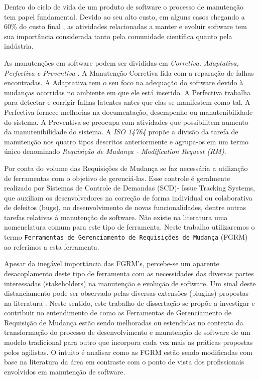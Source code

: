 Dentro do ciclo de vida de um produto de software o processo de manutenção tem
papel fundamental. Devido ao seu alto custo, em alguns casos chegando a 60\%
do custo final \cite{kaur2015review}, as atividades relacionadas a manter e
evoluir software tem sua importância considerada tanto pela comunidade
científica quanto pela indústria.

As manutenções em software podem ser divididas em \textit{Corretiva, Adaptativa,
Perfectiva e Preventiva} \cite{Lientz:1980:SMM:601062,159342}. A Manutenção
Corretiva lida com a reparação de falhas encontradas. A Adaptativa tem o seu
foco na adequação do software devido à mudanças ocorridas no ambiente em que ele
está inserido. A Perfectiva trabalha para detectar e corrigir falhas latentes
antes que elas se manifestem como tal. A  Perfectiva fornece melhorias na
documentação, desempenho ou manutenibilidade do sistema. A Preventiva se
preocupa com atividades que possibilitem aumento da manutenibilidade do sistema.
A \textit{ISO 14764} \cite{1703974} propõe a divisão da tarefa de manutenção nos
quatro tipos descritos anteriormente e agrupa-os em um termo único denominado
\textit{Requisição de Mudança - Modification Request (RM)}.

Por conta do volume das Requisições de Mudança se faz necessária a utilização de
ferramentas com o objetivo de gerenciá-las. Esse controle é geralmente realizado
por Sistemas de Controle de Demandas (SCD)- Issue Tracking Systems, que auxiliam
os desenvolvedores na correção de forma individual ou colaborativa de defeitos
(bugs), no desenvolvimento de novas funcionalidades, dentre outras tarefas
relativas à manutenção de software. Não existe na literatura uma nomenclatura
comum para este tipo de ferramenta. Neste trabalho utilizaremos o termo
\texttt{Ferramentas de Gerenciamento de Requisições de Mudança} (FGRM) ao
referimos a esta ferramenta.

Apesar da inegável importância das FGRM's, percebe-se um aparente desacoplamento 
deste tipo de ferramenta com as necessidades das diversas partes interessadas
(stakeholders) na manutenção e evolução de software. Um sinal deste
distanciamento pode ser observado pelas diversas extensões (plugins) propostas
na literatura
\cite{101186,Thung:2014:BIT:2635868.2661678,Kononenko:2014:DED:2591062.2591075}.
Neste sentido, este trabalho de dissertação se propõe a investigar e contribuir
no entendimento de como as Ferramentas de Gerenciamento de Requisição de Mudança
estão sendo melhoradas ou estendidas no contexto da transformação do processo de
desenvolvimento e manutenção de software de um modelo tradicional para outro que
incorpora cada vez mais as práticas propostas pelos agilistas. O intuito é
analisar como as FGRM estão sendo modificadas com base na literatura da área em
contraste com o ponto de vista dos profissionais envolvidos em manutenção de
software.

